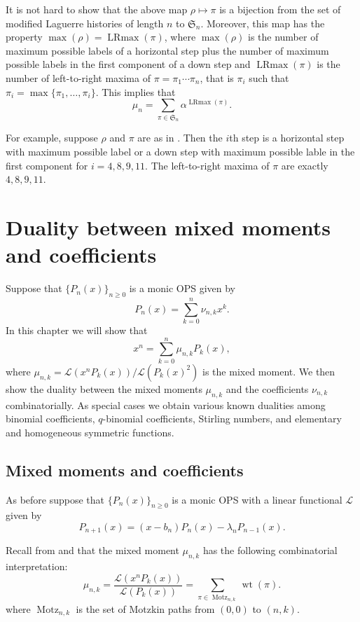 \documentclass[oneside]{book}
\numberwithin{equation}{section}
\theoremstyle{definition}
\newcommand\LRmax{\operatorname{LRmax}}
\newcommand\Motz{\operatorname{Motz}}
\newcommand\sym{\mathfrak{S}}
\newcommand\LL{\mathcal{L}}
\newcommand\wt{\operatorname{wt}}
\begin{document}
It is not hard to show that the above map \( \rho\mapsto \pi \) is a
bijection from the set of modified Laguerre histories of length
\( n \) to \( \sym_n \). Moreover, this map has the property
\( \max(\rho) = \LRmax(\pi) \), where \( \max(\rho) \) is the number
of maximum possible labels of a horizontal step plus the number of
maximum possible labels in the first component of a down step and
\( \LRmax(\pi) \) is the number of left-to-right maxima of
\( \pi=\pi_1 \cdots \pi_n \), that is \( \pi_i \) such that
\( \pi_i = \max\{\pi_1,\dots,\pi_i\} \).
This implies that
\[
  \mu_n = \sum_{\pi\in \sym_n} \alpha^{\LRmax(\pi)}.
\]

For example, suppose \( \rho \) and \( \pi \) are as in
. Then the \( i \)th step is a horizontal
step with maximum possible label or a down step with maximum possible
lable in the first component for \( i=4,8,9,11 \). The left-to-right
maxima of \( \pi \) are exactly \( 4,8,9,11 \).



\chapter{Duality between mixed moments and coefficients}

Suppose that \( \{ P_n(x) \}_{n\ge 0} \) is a monic
OPS given by
\[
    P_n(x) = \sum_{k=0}^{n} \nu_{n,k} x^k.
\]
In this chapter we will show that
\[
  x^n = \sum_{k=0}^{n} \mu_{n,k} P_k(x),
\]
where \( \mu_{n,k} = \LL(x^nP_k(x))/\LL(P_k(x)^2) \) is the mixed
moment. We then show the duality between the mixed moments
\( \mu_{n,k} \) and the coefficients \( \nu_{n,k} \) combinatorially.
As special cases we obtain
various known dualities among
binomial coefficients,
\( q \)-binomial coefficients,
Stirling numbers, and
elementary and homogeneous symmetric functions.



\section{Mixed moments and coefficients}



As before suppose that \( \{ P_n(x) \}_{n\ge 0} \) is a monic OPS with
a linear functional \( \LL \) given by
\[
  P_{n+1}(x) = (x-b_n) P_n(x) - \lambda_n P_{n-1}(x).
\]

Recall from  and  that the
mixed moment \( \mu_{n,k} \) has the following
combinatorial interpretation:
\[
  \mu_{n,k} = \frac{\LL(x^nP_k(x))}{\LL(P_k(x))} = 
  \sum_{\pi\in \Motz_{n,k}} \wt(\pi).
\]
where \( \Motz_{n,k} \) is the set of Motzkin paths from \( (0,0) \)
to \( (n,k) \).
\end{document}

